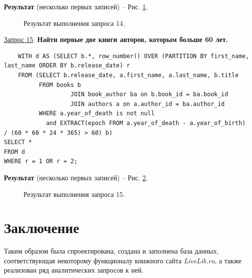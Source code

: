 \documentclass[a4paper,12pt]{article}
\begin{document}
\textbf{Результат} (несколько первых записей) -- Рис. \ref{fig:request14}.

\begin{figure}[ht]
    \caption{Результат выполнения запроса 14.}
    \label{fig:request14}
\end{figure}

\underline{Запрос 15}. \textbf{Найти первые две книги авторов, которым больше 60 лет.}
\begin{lstlisting}
    WITH d AS (SELECT b.*, row_number() OVER (PARTITION BY first_name, last_name ORDER BY b.release_date) r
    FROM (SELECT b.release_date, a.first_name, a.last_name, b.title
          FROM books b
                   JOIN book_author ba on b.book_id = ba.book_id
                   JOIN authors a on a.author_id = ba.author_id
          WHERE a.year_of_death is not null
            and EXTRACT(epoch FROM a.year_of_death - a.year_of_birth) / (60 * 60 * 24 * 365) > 60) b)
SELECT *
FROM d
WHERE r = 1 OR r = 2;
    \end{lstlisting}

\textbf{Результат} (несколько первых записей) -- Рис. \ref{fig:request15}.

\begin{figure}[ht]
    \caption{Результат выполнения запроса 15.}
    \label{fig:request15}
\end{figure}


\newpage
\section{Заключение}
Таким образом была спроектирована, создана и заполнена база данных, соответствующая некоторому функционалу книжного сайта \textsl{LiveLib.ru}, а также реализован ряд аналитических запросов к ней.
\end{document}

